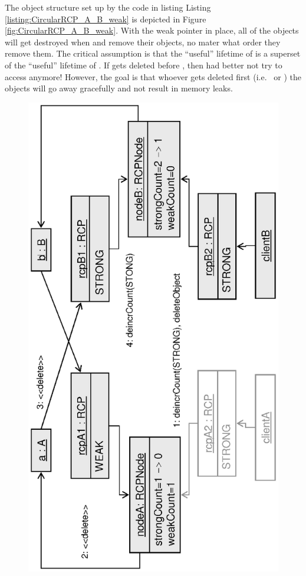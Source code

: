 \documentclass[pdf,ps2pdf,11pt]{SANDreport}
\begin{document}
The object structure set up by the code in listing Listing
{}\ref{listing:CircularRCP_A_B_weak} is depicted in Figure
{}\ref{fig:CircularRCP_A_B_weak}.  With the weak pointer in place, all
of the objects will get destroyed when {} and
{} remove their {} objects, no mater what
order they remove them.  The critical assumption is that the
``useful'' lifetime of {} is a superset of the ``useful''
lifetime of {}.  If {} gets deleted before
{}, then {} had better not try to access
{} anymore!  However, the goal is that whoever gets deleted
first (i.e.\ {} or {}) the objects
will go away gracefully and not result in memory leaks.


{\bsinglespace
\begin{figure}
\begin{center}
\includegraphics*[angle=270,scale=0.65]{CircularRCP_A_B_ClientA_1}

\end{center}
\end{figure}}
\end{document}
